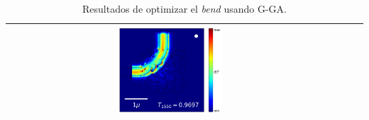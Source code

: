 \begin{table}[ht]
\begin{tabular}{|c|c|c|c|}
      \includegraphics[width=0.33\textwidth]{image/results/bend/GA/visualize_field_fab_512.png} \\
    \hline
    \end{tabular}
    \hspace*{-3cm}
    \caption{Resultados de optimizar el \emph{bend} usando G-GA.}
    \label{tab:opt-GA-bend}
\end{table}
